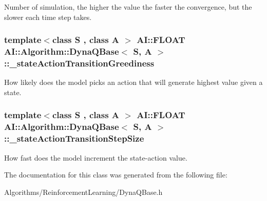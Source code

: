 Number of simulation, the higher the value the faster the convergence, but the slower each time step takes. \hypertarget{classAI_1_1Algorithm_1_1DynaQBase_ae3f83dbeea191fc8bdcd518a2e54af97}{
\subsubsection[{\+\_\+state\+Action\+Transition\+Greediness}]{\setlength{\rightskip}{0pt plus 5cm}template$<$class S , class A $>$ {\bf A\+I\+::\+F\+L\+O\+A\+T} {\bf A\+I\+::\+Algorithm\+::\+Dyna\+Q\+Base}$<$ S, A $>$\+::\+\_\+state\+Action\+Transition\+Greediness\hspace{0.3cm}{\ttfamily [protected]}}}\label{classAI_1_1Algorithm_1_1DynaQBase_ae3f83dbeea191fc8bdcd518a2e54af97}
How likely does the model picks an action that will generate highest value given a state. \hypertarget{classAI_1_1Algorithm_1_1DynaQBase_a1fd132ae0aeb356a891e5b81bf218338}{
\subsubsection[{\+\_\+state\+Action\+Transition\+Step\+Size}]{\setlength{\rightskip}{0pt plus 5cm}template$<$class S , class A $>$ {\bf A\+I\+::\+F\+L\+O\+A\+T} {\bf A\+I\+::\+Algorithm\+::\+Dyna\+Q\+Base}$<$ S, A $>$\+::\+\_\+state\+Action\+Transition\+Step\+Size\hspace{0.3cm}{\ttfamily [protected]}}}\label{classAI_1_1Algorithm_1_1DynaQBase_a1fd132ae0aeb356a891e5b81bf218338}
How fast does the model increment the state-\/action value. 

The documentation for this class was generated from the following file\+:\begin{DoxyCompactItemize}
\item 
Algorithms/\+Reinforcement\+Learning/Dyna\+Q\+Base.\+h\end{DoxyCompactItemize}
